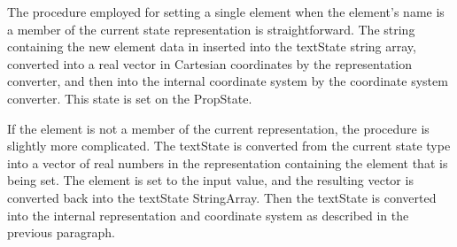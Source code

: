 The procedure employed for setting a single element when the element's name is a member of the
current state representation is straightforward.  The string containing the new element data in
inserted into the textState string array, converted into a real vector in Cartesian coordinates by
the representation converter, and then into the internal coordinate system by the coordinate system
converter.  This state is set on the PropState.

If the element is not a member of the current representation, the procedure is slightly more
complicated. The textState is converted from the current state type into a vector of real numbers
in the representation containing the element that is being set.  The element is set to the input
value, and the resulting vector is converted back into the textState StringArray.  Then the
textState is converted into the internal representation and coordinate system as described in the
previous paragraph.
